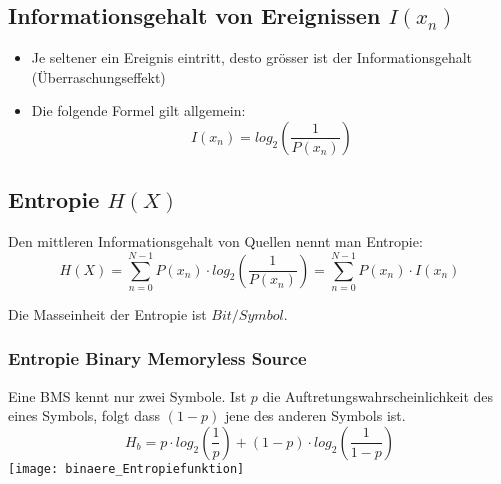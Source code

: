 \subsection{Informationsgehalt von Ereignissen $I(x_n)$}
\begin{itemize}
	\item Je seltener ein Ereignis eintritt, desto grösser ist der
	      Informationsgehalt (Überraschungseffekt)
	\item Die folgende Formel gilt allgemein:
	      \begin{equation*}
		      I(x_n) = log_2(\frac{1}{P(x_n)})
	      \end{equation*}
\end{itemize}
\subsection{Entropie $H(X)$}
Den mittleren Informationsgehalt von Quellen nennt man Entropie:
\begin{equation*}
	H(X) = \sum_{n=0}^{N-1} P(x_n) \cdot log_2(\frac{1}{P(x_n)}) = \sum_{n=0}^{N-1} P(x_n) \cdot I(x_n)
\end{equation*}

Die Masseinheit der Entropie ist $Bit/Symbol$.
\subsubsection{Entropie Binary Memoryless Source}
Eine BMS kennt nur zwei Symbole. Ist $p$ die Auftretungswahrscheinlichkeit des eines Symbols, folgt dass $(1-p)$ jene des anderen Symbols ist.
\begin{equation*}
	H_b = p  \cdot log_2(\frac{1}{p}) + (1-p)  \cdot log_2(\frac{1}{1-p})
\end{equation*}
\texttt{[image: binaere\_Entropiefunktion]}